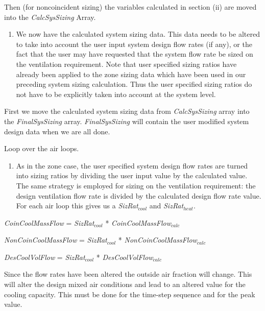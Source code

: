Then (for noncoincident sizing) the variables calculated in section (ii) are moved into the \emph{CalcSysSizing} Array.

\begin{enumerate}
\def\labelenumi{(\arabic{enumi})}
\setcounter{enumi}{1}
\tightlist
\item
  We now have the calculated system sizing data. This data needs to be altered to take into account the user input system design flow rates (if any), or the fact that the user may have requested that the system flow rate be sized on the ventilation requirement. Note that user specified sizing ratios have already been applied to the zone sizing data which have been used in our preceding system sizing calculation. Thus the user specified sizing ratios do not have to be explicitly taken into account at the system level.
\end{enumerate}

First we move the calculated system sizing data from \emph{CalcSysSizing} array into the \emph{FinalSysSizing} array. \emph{FinalSysSizing} will contain the user modified system design data when we are all done.

Loop over the air loops.

\begin{enumerate}
\def\labelenumi{(\roman{enumi})}
\tightlist
\setlength\itemindent{25pt} \item As in the zone case, the user specified system design flow rates are turned into sizing ratios by dividing the user input value by the calculated value. The same strategy is employed for sizing on the ventilation requirement: the design ventilation flow rate is divided by the calculated design flow rate value. For each air loop this gives us a \emph{SizRat\(_{cool}\)} and \emph{SizRat\(_{heat}\)}.
\end{enumerate}

\emph{CoinCoolMassFlow} = \emph{SizRat\(_{cool}\)} * \emph{CoinCoolMassFlow\(_{calc}\)}

\emph{NonCoinCoolMassFlow} = \emph{SizRat\(_{cool}\)} * \emph{NonCoinCoolMassFlow\(_{calc}\)}

\emph{DesCoolVolFlow} = \emph{SizRat\(_{cool}\)} * \emph{DesCoolVolFlow\(_{calc}\)}

Since the flow rates have been altered the outside air fraction will change. This will alter the design mixed air conditions and lead to an altered value for the cooling capacity. This must be done for the time-step sequence and for the peak value.

